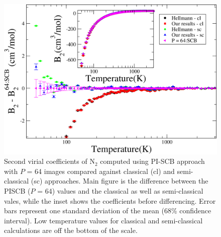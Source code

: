             \begin{figure}[!htbp]
                \centering
                \includegraphics[scale=0.20,keepaspectratio]{Chapter-5/Figures/B2N2AllCLSCDiff.png}
                \caption{Second virial coefficients of N$_2$ computed using PI-SCB approach with $P$ = 64 images compared against classical (cl) and semi-classical (sc) approaches. Main figure is the difference between the PISCB ($P$ = 64) values and the classical as well as semi-classical vales, while the inset shows the coefficients before differencing. Error bars represent one standard deviation of the mean (68\% confidence interval). Low temperature values for classical and semi-classical calculations are off the bottom of the scale.}
                \label{fig:B2N2AllCLSCDiff}
            \end{figure}


